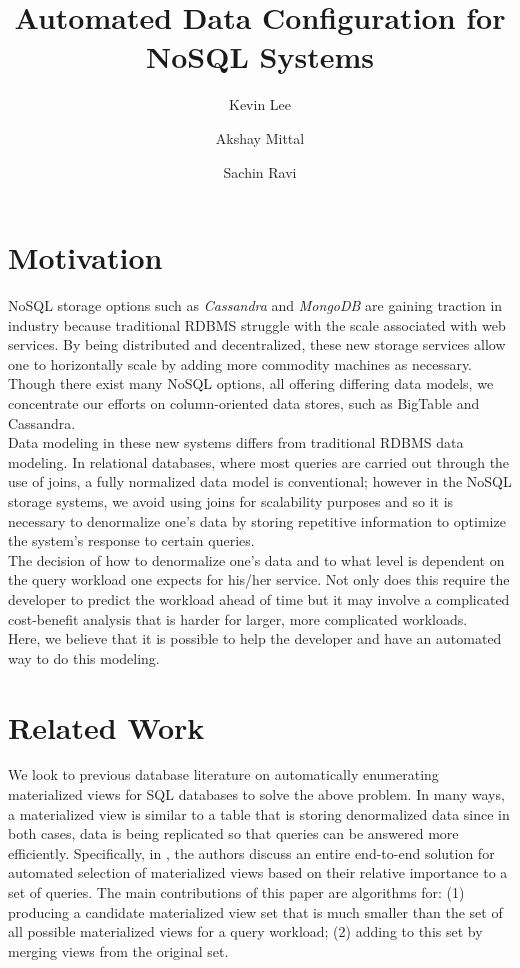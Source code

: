 \documentclass[10pt]{article}
\begin{document}
\title{\bf Automated Data Configuration for NoSQL Systems}
\author {Kevin Lee \and Akshay Mittal \and Sachin Ravi}

\date{}
\maketitle

\section{Motivation}
NoSQL storage options such as \emph{Cassandra} and \emph{MongoDB} are gaining traction in industry because traditional
RDBMS struggle with the scale associated with web services. By being distributed and decentralized, these new storage 
services allow one to horizontally scale by adding more commodity machines as necessary. Though there exist many NoSQL
options, all offering differing data models, we concentrate our efforts on column-oriented data stores, such as BigTable
and Cassandra.\\

\noindent Data modeling in these new systems differs from traditional RDBMS data modeling. In relational databases, where most queries
are carried out through the use of joins, a fully normalized data model is conventional; however in the NoSQL storage systems, 
we avoid using joins for scalability purposes and so it is necessary to denormalize one's data by storing repetitive information 
to optimize the system's response to certain queries.\\

\noindent The decision of how to denormalize one's data and to what level is dependent on the query workload one expects for his/her service.
Not only does this require the developer to predict the workload ahead of time but it may involve a complicated cost-benefit analysis that
is harder for larger, more complicated workloads.\\

\noindent Here, we believe that it is possible to help the developer and have an automated way to do this modeling. 

\section{Related Work}
We look to previous database literature on automatically enumerating materialized views for SQL databases to solve the above problem. 
In many ways, a materialized view is similar to a table that is storing denormalized data since in both cases, data is being replicated so 
that queries can be answered more efficiently. Specifically, in \cite{agrawal2000automated}, the authors discuss an entire end-to-end solution
for automated selection of materialized views based on their relative importance to a set of queries. The main contributions of this paper are 
algorithms for: (1) producing a candidate materialized view set that is much smaller than the set of all possible materialized views for a
query workload; (2) adding to this set by merging views from the original set.\\
\end{document}
